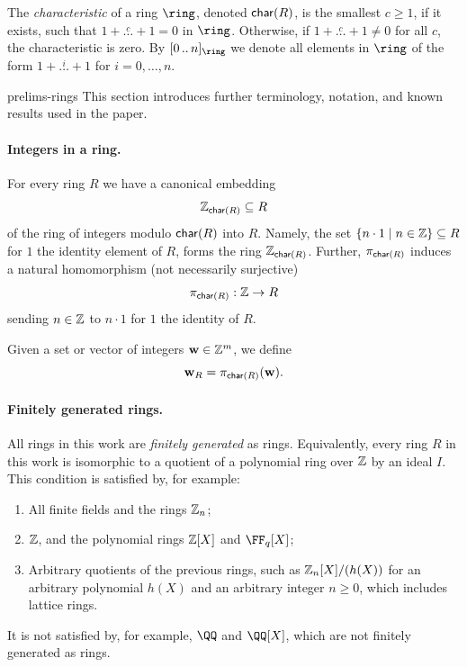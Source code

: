  The \emph{characteristic} of a ring $\ring$, denoted $\mathsf{char}(R)$, is the smallest $c\geq 1$, if it exists, such that $1 + \overset{c}{\ldots} + 1 = 0$ in $\ring$. Otherwise, if $1 + \overset{c}{\ldots} + 1 \neq 0$ for all $c$, the characteristic is zero.
 By $\range{0}{n}_\ring$ we denote all elements in $\ring$ of the form $1 + \overset{i}{\ldots} + 1$ for $i=0,\ldots, n$.
\begin{lncsappendix}{prelims-rings}%
    \iflncs 
This section introduces further terminology, notation, and known results used in the paper. 
    \else\fi
\iflncs\paragraph{Integers in a ring.}\fi
For every ring $R$ we have a canonical embedding 
 $$
    \mathbb{Z}_{\mathsf{char}(R)} \subseteq R
 $$
of the ring of integers modulo $\mathsf{char}(R)$ into $R$. Namely, the set $\{n \cdot 1 \mid n\in \mathbb{Z}\} \subseteq R$ for $1$ the identity element of $R$, forms the ring  $\mathbb{Z}_{\mathsf{char}(R)}$. Further, $\pi_{\mathsf{char}(R)}$ induces a natural homomorphism (not necessarily surjective)
%
\begin{equation}\label{e:Z_to_ring}
\pi_{\mathsf{char}(R)} : \mathbb{Z} \to R
\end{equation}
sending $n\in \mathbb{Z}$ to $n\cdot 1$ for $1$ the identity of $R$. 

Given a set or vector of integers $\mathbf{w}\in \mathbb{Z}^m$, we define \begin{equation}\label{e:integers_subscript_proj}\mathbf{w}_R= \pi_{\mathsf{char}(R)}(\mathbf{w}).\end{equation}
\end{lncsappendix}
 
 \paragraph{Finitely generated rings.} All rings in this work are \emph{finitely generated} as rings. Equivalently, every ring $R$ in this work is isomorphic to a quotient  of a polynomial ring over $\mathbb{Z}$ by an ideal $I$. This condition is satisfied by, for example:
\begin{enumerate}[leftmargin=*,nosep]
\item All finite fields and the rings $\mathbb{Z}_n$; 
\item $\mathbb{Z}$, and the polynomial rings $\mathbb{Z}[X]$ and $\FF_q[X]$;
\item Arbitrary quotients of the previous rings, such as $\mathbb{Z}_n[X]/(h(X))$ for an arbitrary polynomial $h(X)$ and an arbitrary integer $n\geq 0$, which includes  lattice rings. 
\end{enumerate}
It is not satisfied by, for example, $\QQ$ and $\QQ[X]$, which are not finitely generated as rings. %


